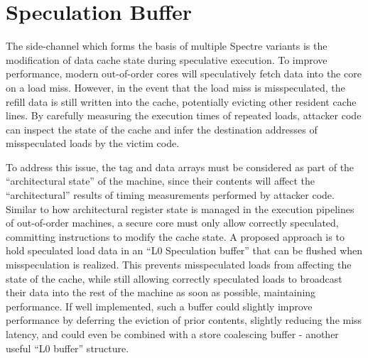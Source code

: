 \section{Speculation Buffer}
\label{specbuf}
The side-channel which forms the basis of multiple Spectre variants is the modification of data cache state during speculative execution.
To improve performance, modern out-of-order cores will speculatively fetch data into the core on a load miss.
However, in the event that the load miss is misspeculated, the refill data is still written into the cache, potentially evicting other resident cache lines.
By carefully measuring the execution times of repeated loads, attacker code can inspect the state of the cache and infer the destination addresses of misspeculated loads by the victim code.

To address this issue, the tag and data arrays must be considered as part of the ``architectural state'' of the machine, since their contents will affect the ``architectural'' results of timing measurements performed by attacker code.
Similar to how architectural register state is managed in the execution pipelines of out-of-order machines, a secure core must only allow correctly speculated, committing instructions to modify the cache state.
A proposed approach is to hold speculated load data in an ``L0 Speculation buffer'' that can be flushed when misspeculation is realized.
This prevents misspeculated loads from affecting the state of the cache, while still allowing correctly speculated loads to broadcast their data into the rest of the machine as soon as possible, maintaining performance. If well implemented, such a buffer could slightly improve performance by deferring the eviction of prior contents, slightly reducing the miss latency, and could even be combined with a store coalescing buffer - another useful ``L0 buffer'' structure.


